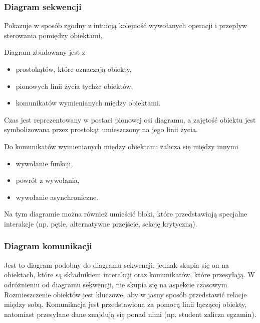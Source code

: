 \subsubsection{Diagram sekwencji}
Pokazuje w sposób zgodny z intuicją kolejność wywołanych operacji i przepływ sterowania pomiędzy obiektami.

Diagram zbudowany jest z
\begin{itemize}
	\item{prostokątów, które oznaczają obiekty,}
	\item{pionowych linii życia tychże obiektów,}
	\item{komunikatów wymienianych między obiektami.}
\end{itemize}

Czas jest reprezentowany w postaci pionowej osi diagramu, a zajętość obiektu jest symbolizowana przez prostokąt umieszczony na jego linii życia.

Do komunikatów wymienianych między obiektami zalicza się między innymi
\begin{itemize}
	\setlength\itemsep{1pt}
	\item{wywołanie funkcji,}
	\item{powrót z wywołania,}
	\item{wywołanie asynchroniczne.}
\end{itemize}

Na tym diagramie można również umieścić bloki, które przedstawiają specjalne interakcje (np. pętle, alternatywne przejście, sekcję krytyczną).

\subsubsection{Diagram komunikacji}
Jest to diagram podobny do diagramu sekwencji, jednak skupia się on na obiektach, które są składnikiem interakcji oraz komunikatów, które przesyłają. W odróżnieniu od diagramu sekwencji, nie skupia się na aspekcie czasowym. Rozmieszczenie obiektów jest kluczowe, aby w jasny sposób przedstawić relacje między sobą. Komunikacja jest przedstawiona za pomocą linii łączącej obiekty, natomiast przesyłane dane znajdują się ponad nimi (np. student zalicza egzamin).
